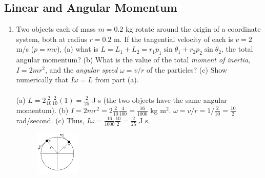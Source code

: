 \documentclass[10pt]{article}
\begin{document}
\subsection{Linear and Angular Momentum}
\begin{enumerate}
\item Two objects each of mass $m = 0.2$ kg rotate around the origin of a coordinate system, both at radius $r = 0.2$ m.  If the tangential velocity of each is $v = 2$ m/s ($p = mv$), (a) what is $L = L_1 + L_2 = r_1 p_1\sin\theta_1+r_2 p_2\sin\theta_2$, the total angular momentum?  (b) What is the value of the total \textit{moment of inertia}, $I = 2mr^2$, and the \textit{angular speed} $\omega = v/r$ of the particles?  (c) Show numerically that $I\omega = L$ from part (a). \\ \\
(a) $L = 2\frac{2}{10}\frac{2}{10}(1) = \frac{2}{25}$ J s (the two objects have the same angular momentum).  (b) $I = 2mr^2 = 2\frac{2}{10}\frac{4}{100} = \frac{16}{1000}$ kg m$^2$. $\omega = v/r = 1/\frac{2}{10} = \frac{10}{2}$ rad/second.  (c) Thus, $I\omega = \frac{16}{1000}\frac{10}{2} = \frac{2}{25}$ J s.
\begin{figure}[hb]
\centering
\includegraphics[width=0.2\textwidth]{rotate.pdf}
\end{figure}
\end{enumerate}
\end{document}

